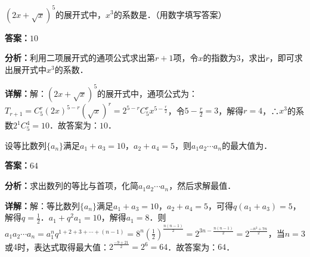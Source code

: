\begin{question}[points=5]
$(2x+\sqrt{x})^5$的展开式中，$x^3$的系数是．（用数字填写答案）
\fillin[{$10$}]
\begin{solution}
\textbf{答案：}$10$

\textbf{分析：}利用二项展开式的通项公式求出第$r+1$项，令$x$的指数为$3$，求出$r$，即可求出展开式中$x^3$的系数．

\textbf{详解：}解：$(2x+\sqrt{x})^5$的展开式中，通项公式为：$T_{r+1}=C_5^r(2x)^{5-r}(\sqrt{x})^r=2^{5-r}C_5^r x^{5-\frac{r}{2}}$，令$5-\frac{r}{2}=3$，解得$r=4$，∴$x^3$的系数$2^{1}C_5^4=10$．故答案为：$10$．
\end{solution}
\end{question}

\begin{question}[points=5]
设等比数列$\{a_n\}$满足$a_1+a_3=10$，$a_2+a_4=5$，则$a_1a_2\cdots a_n$的最大值为．
\fillin[{$64$}]
\begin{solution}
\textbf{答案：}$64$

\textbf{分析：}求出数列的等比与首项，化简$a_1a_2\cdots a_n$，然后求解最值．

\textbf{详解：}解：等比数列$\{a_n\}$满足$a_1+a_3=10$，$a_2+a_4=5$，可得$q(a_1+a_3)=5$，解得$q=\frac{1}{2}$．$a_1+q^2a_1=10$，解得$a_1=8$．则$a_1a_2\cdots a_n=a_1^n q^{1+2+3+\cdots+(n-1)}=8^n \left(\frac{1}{2}\right)^{\frac{n(n-1)}{2}}=2^{3n-\frac{n(n-1)}{2}}=2^{\frac{-n^2+7n}{2}}$，当$n=3$或$4$时，表达式取得最大值：$2^{\frac{-9+21}{2}}=2^6=64$．故答案为：$64$．
\end{solution}
\end{question}

